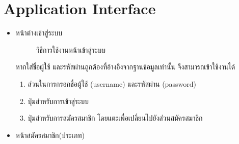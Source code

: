 \documentclass[12pt,oneside,openright,a4paper]{cpe-thai-project}
\begin{document}
\section{Application Interface}
\begin{itemize}
  \item หน้าต่างเข้าสู่ระบบ
  \begin{figure}[!ht]\centering
    \setlength{\fboxrule}{0.2mm} %
    \setlength{\fboxsep}{1cm}
    \caption{วิธีการใช้งานหน้าเข้าสู่ระบบ}\label{fig:system}
  \end{figure}
  หากใส่ชื่อผู้ใช้ และรหัสผ่านถูกต้องที่อ้างอิงจากฐานข้อมูลเท่านั้น จึงสามารถเข้าใช้งานได้
  \begin{enumerate}
    \item ส่วนในการกรอกชื่อผู้ใช้ (username) และรหัสผ่าน (password)
    \item ปุ่มสำหรับการเข้าสู่ระบบ
    \item ปุ่มสำหรับการสมัครสมาชิก โดยแตะเพื่อเปลี่ยนไปยังส่วนสมัครสมาชิก
  \end{enumerate} 
  \newpage
  \item หน้าสมัครสมาชิก(ประเภท)
  \begin{figure}[!ht]\centering
    \setlength{\fboxrule}{0.2mm} %
    \setlength{\fboxsep}{1cm}

\end{figure}
\end{itemize}
\end{document}
